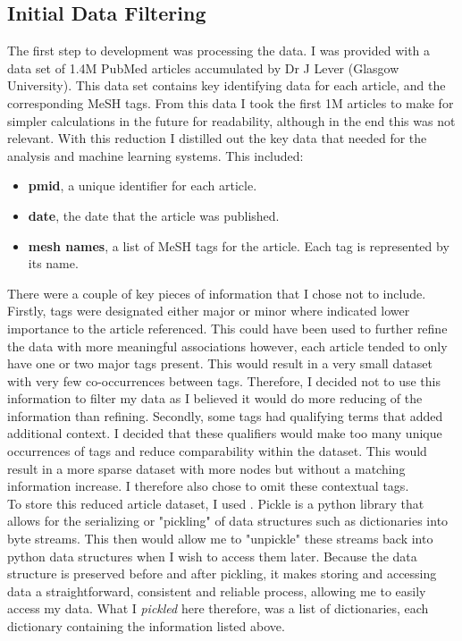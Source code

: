 \documentclass{l4proj}
\begin{document}
\subsection{Initial Data Filtering}

The first step to development was processing the data. I was provided with a data set of 1.4M PubMed articles accumulated by Dr J Lever (Glasgow University). This data set contains key identifying data for each article, and the corresponding MeSH tags. From this data I took the first 1M articles to make for simpler calculations in the future for readability, although in the end this was not relevant. With this reduction I distilled out the key data that needed for the analysis and machine learning systems. This included:
\\
\begin{itemize}
    \item \textbf{pmid}, a unique identifier for each article.
    \item \textbf{date}, the date that the article was published.
    \item \textbf{mesh names}, a list of MeSH tags for the article. Each tag is represented by its name. \\
\end{itemize}

There were a couple of key pieces of information that I chose not to include. Firstly, tags were designated either major or minor where  indicated lower importance to the article referenced. This could have been used to further refine the data with more meaningful associations however, each article tended to only have one or two major tags present. This would result in a very small dataset with very few co-occurrences between tags. Therefore, I decided not to use this information to filter my data as I believed it would do more reducing of the information than refining. Secondly, some tags had qualifying terms that added additional context. I decided that these qualifiers would make too many unique occurrences of tags and reduce comparability within the dataset. This would result in a more sparse dataset with  more nodes but without a matching information increase. I therefore also chose to omit these contextual tags.\\

To store this reduced article dataset, I used \cite{pickle}. Pickle is a python library that allows for the serializing or "pickling" of data structures such as dictionaries into byte streams. This then would allow me to "unpickle" these streams back into python data structures when I wish to access them later. Because the data structure is preserved before and after pickling, it makes storing and accessing data a straightforward, consistent and reliable process, allowing me to easily access my data. What I \textit{pickled} here therefore, was a list of dictionaries, each dictionary containing the information listed above.\\
\end{document}

